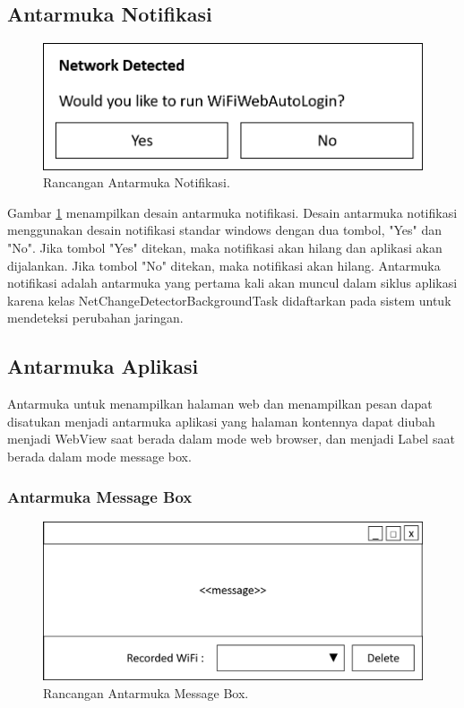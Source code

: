\subsection{Antarmuka Notifikasi}
\label{subsec:antarmuka_notifikasi}

\begin{figure}[!htb]
    \centering
    \includegraphics[scale=0.5]{Gambar/UI_Notification.png}
    \caption[Rancangan Antarmuka Notifikasi.]{Rancangan Antarmuka Notifikasi.}
    \label{fig:RancanganAntarmukaNotifikasi}
\end{figure}

Gambar \ref{fig:RancanganAntarmukaNotifikasi} menampilkan desain antarmuka notifikasi. Desain antarmuka notifikasi menggunakan desain notifikasi standar windows dengan dua tombol, "Yes" dan "No". Jika tombol "Yes" ditekan, maka notifikasi akan hilang dan aplikasi akan dijalankan. Jika tombol "No" ditekan, maka notifikasi akan hilang. Antarmuka notifikasi adalah antarmuka yang pertama kali akan muncul dalam siklus aplikasi karena kelas NetChangeDetectorBackgroundTask didaftarkan pada sistem untuk mendeteksi perubahan jaringan.

\subsection{Antarmuka Aplikasi}
\label{subsec:antarmuka_aplikasi}

Antarmuka untuk menampilkan halaman web dan menampilkan pesan dapat disatukan menjadi antarmuka aplikasi yang halaman kontennya dapat diubah menjadi WebView saat berada dalam mode web browser, dan menjadi Label saat berada dalam mode message box.

\subsubsection{Antarmuka Message Box}
\label{subsec:antarmuka_message_box}

\begin{figure}[!htb]
    \centering
    \includegraphics[scale=0.5]{Gambar/UI_MessageBox.png}
    \caption[Rancangan Antarmuka Message Box.]{Rancangan Antarmuka Message Box.}
    \label{fig:RancanganAntarmukaMessageBox}
\end{figure}


